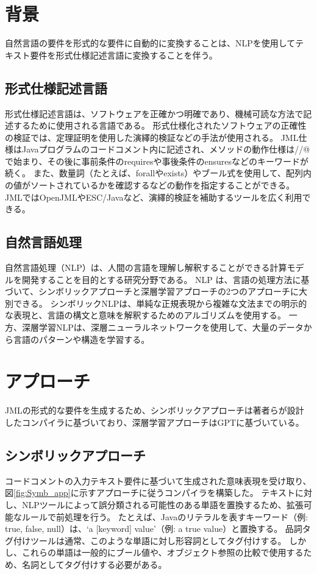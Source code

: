 \documentclass[uplatex, twocolumn, 10pt]{jsarticle} %
\begin{document}
\section{背景}
\label{sec:background}
自然言語の要件を形式的な要件に自動的に変換することは、NLPを使用してテキスト要件を形式仕様記述言語に変換することを伴う。

\subsection{形式仕様記述言語}
形式仕様記述言語は、ソフトウェアを正確かつ明確であり、機械可読な方法で記述するために使用される言語である。
形式仕様化されたソフトウェアの正確性の検証では、定理証明を使用した演繹的検証などの手法が使用される。
JML仕様はJavaプログラムのコードコメント内に記述され、メソッドの動作仕様は//@で始まり、その後に事前条件のrequiresや事後条件のensuresなどのキーワードが続く。
また、数量詞（たとえば、forallやexists）やブール式を使用して、配列内の値がソートされているかを確認するなどの動作を指定することができる。
JMLではOpenJML\cite{4}やESC/Java\cite{6}など、演繹的検証を補助するツールを広く利用できる。

\subsection{自然言語処理}
自然言語処理（NLP）は、人間の言語を理解し解釈することができる計算モデルを開発することを目的とする研究分野である。
NLP は、言語の処理方法に基づいて、シンボリックアプローチと深層学習アプローチの2つのアプローチに大別できる。
シンボリックNLPは、単純な正規表現から複雑な文法までの明示的な表現と、言語の構文と意味を解釈するためのアルゴリズムを使用する\cite{3}。
一方、深層学習NLPは、深層ニューラルネットワークを使用して、大量のデータから言語のパターンや構造を学習する\cite{2}。

\section{アプローチ}
\label{sec:approaches}
JMLの形式的な要件を生成するため、シンボリックアプローチは著者らが設計したコンパイラに基づいており、深層学習アプローチはGPTに基づいている。

\subsection{シンボリックアプローチ}
コードコメントの入力テキスト要件に基づいて生成された意味表現を受け取り、図\ref{fig:Symb_app}に示すアプローチに従うコンパイラを構築した。
テキストに対し、NLPツールによって誤分類される可能性のある単語を置換するため、拡張可能なルールで前処理を行う。
たとえば、Javaのリテラルを表すキーワード（例: true, false, null）は、`a [keyword] value'（例: a true value）と置換する。
品詞タグ付けツールは通常、このような単語に対し形容詞としてタグ付けする。
しかし、これらの単語は一般的にブール値や、オブジェクト参照の比較で使用するため、名詞としてタグ付けする必要がある。
\end{document}
